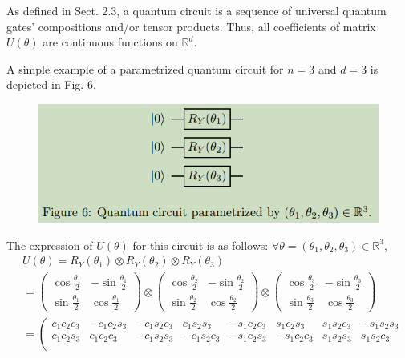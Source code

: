 As defined in Sect. 2.3, a quantum circuit is a sequence of universal quantum gates' compositions and/or tensor products. Thus, all coefficients of matrix $U(\theta)$ are continuous functions on $\mathbb{R}^{d}$.

\begin{example}
    A simple example of a parametrized quantum circuit for $n=3$ and $d=3$ is depicted in Fig. 6.
\begin{figure}[h]
    \centering
    \includegraphics[width=0.75\linewidth]{Images/parametrized-quantum-circuit.png}
\end{figure}
The expression of $U(\theta)$ for this circuit is as follows: $\forall \theta=\left(\theta_1, \theta_2, \theta_3\right) \in \mathbb{R}^3$,
\begin{equation}
\begin{aligned}
& U(\theta)=R_Y\left(\theta_1\right) \otimes R_Y\left(\theta_2\right) \otimes R_Y\left(\theta_3\right) \\
& =\left(\begin{array}{cc}
\cos \frac{\theta_1}{2} & -\sin \frac{\theta_1}{2} \\
\sin \frac{\theta_1}{2} & \cos \frac{\theta_1}{2}
\end{array}\right) \otimes\left(\begin{array}{cc}
\cos \frac{\theta_2}{2} & -\sin \frac{\theta_2}{2} \\
\sin \frac{\theta_2}{2} & \cos \frac{\theta_2}{2}
\end{array}\right) \otimes\left(\begin{array}{cc}
\cos \frac{\theta_3}{2} & -\sin \frac{\theta_3}{2} \\
\sin \frac{\theta_3}{2} & \cos \frac{\theta_3}{2}
\end{array}\right) \\
& =\left(\begin{array}{cccccccc}
c_1 c_2 c_3 & -c_1 c_2 s_3 & -c_1 s_2 c_3 & c_1 s_2 s_3 & -s_1 c_2 c_3 & s_1 c_2 s_3 & s_1 s_2 c_3 & -s_1 s_2 s_3 \\
c_1 c_2 s_3 & c_1 c_2 c_3 & -c_1 s_2 s_3 & -c_1 s_2 c_3 & -s_1 c_2 s_3 & -s_1 c_2 c_3 & s_1 s_2 s_3 & s_1 s_2 c_3 \\

\end{array}
\end{aligned}
\end{equation}
\end{example}
